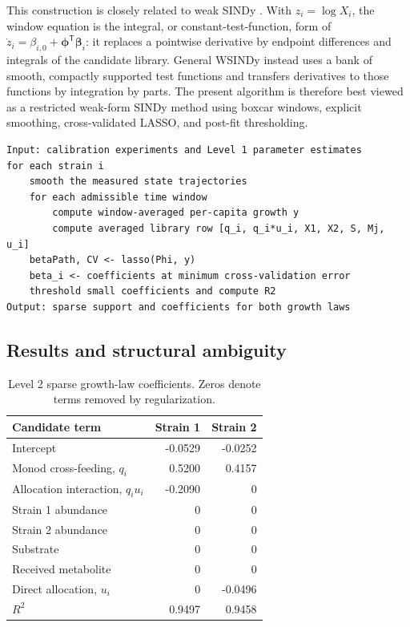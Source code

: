 \documentclass[11pt,a4paper]{article}
\newcommand{\vect}[1]{\boldsymbol{#1}}
\begin{document}
This construction is closely related to weak SINDy
\cite{MessengerBortz2021}. With \(z_i=\log X_i\), the window equation is the
integral, or constant-test-function, form of
\(\dot z_i=\beta_{i,0}+\vect{\phi}^{\mathsf T}\vect{\beta}_i\): it replaces a
pointwise derivative by endpoint differences and integrals of the candidate
library. General WSINDy instead uses a bank of smooth, compactly supported test
functions and transfers derivatives to those functions by integration by
parts. The present algorithm is therefore best viewed as a restricted
weak-form SINDy method using boxcar windows, explicit smoothing,
cross-validated LASSO, and post-fit thresholding.

\noindent\begin{minipage}{\linewidth}
\begin{lstlisting}[style=pseudostyle,title={Compact MATLAB pseudocode}]
Input: calibration experiments and Level 1 parameter estimates
for each strain i
    smooth the measured state trajectories
    for each admissible time window
        compute window-averaged per-capita growth y
        compute averaged library row [q_i, q_i*u_i, X1, X2, S, Mj, u_i]
    betaPath, CV <- lasso(Phi, y)
    beta_i <- coefficients at minimum cross-validation error
    threshold small coefficients and compute R2
Output: sparse support and coefficients for both growth laws
\end{lstlisting}
\end{minipage}

\subsection{Results and structural ambiguity}

\begin{table}[H]
\centering
\caption{Level 2 sparse growth-law coefficients. Zeros denote terms removed
by regularization.}
\label{tab:level2}
\begin{tabular}{lrr}
\toprule
Candidate term & Strain 1 & Strain 2\\
\midrule
Intercept & -0.0529 & -0.0252\\
Monod cross-feeding, \(q_i\) & 0.5200 & 0.4157\\
Allocation interaction, \(q_i u_i\) & -0.2090 & 0\\
Strain 1 abundance & 0 & 0\\
Strain 2 abundance & 0 & 0\\
Substrate & 0 & 0\\
Received metabolite & 0 & 0\\
Direct allocation, \(u_i\) & 0 & -0.0496\\
\midrule
\(R^2\) & 0.9497 & 0.9458\\
\bottomrule
\end{tabular}
\end{table}
\end{document}
